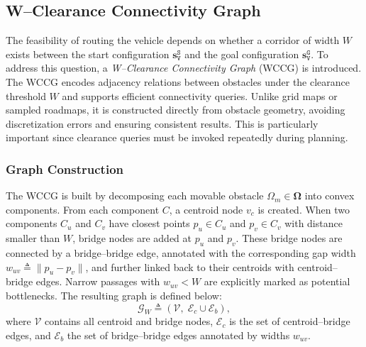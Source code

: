 \subsection{W--Clearance Connectivity Graph}\label{subsec:wccg}

The feasibility of routing the vehicle depends on whether a corridor of width
$W$ exists between the start configuration $\mathbf{s}_\texttt{V}^{\texttt{S}}$
and the goal configuration $\mathbf{s}_\texttt{V}^{\texttt{G}}$. To address
this question, a \emph{W--Clearance Connectivity Graph} (WCCG) is introduced.
The WCCG encodes adjacency relations between obstacles under the clearance
threshold $W$ and supports efficient connectivity queries. Unlike grid maps or
sampled roadmaps, it is constructed directly from obstacle geometry, avoiding
discretization errors and ensuring consistent results. This is particularly
important since clearance queries must be invoked repeatedly during planning.

\subsubsection{Graph Construction}
The WCCG is built by decomposing each movable obstacle
$\Omega_m\in\boldsymbol{\Omega}$ into convex components. From each component
$C$, a centroid node $v_c$ is created. When two components $C_u$ and $C_v$
have closest points $p_u\in C_u$ and $p_v\in C_v$ with distance smaller than
$W$, bridge nodes are added at $p_u$ and $p_v$. These bridge nodes are
connected by a bridge--bridge edge, annotated with the corresponding gap width
$w_{uv}\triangleq\|p_u-p_v\|$, and further linked back to their centroids with
centroid--bridge edges. Narrow passages with $w_{uv}<W$ are explicitly marked
as potential bottlenecks. The resulting graph is defined below:
\begin{equation}\label{eq:wccg}
\mathcal{G}_W\triangleq(\mathcal{V},\; \mathcal{E}_c\cup\mathcal{E}_b),
\end{equation}
where $\mathcal{V}$ contains all centroid and bridge nodes,
$\mathcal{E}_c$ is the set of centroid--bridge edges, and $\mathcal{E}_b$ the
set of bridge--bridge edges annotated by widths $w_{uv}$.

